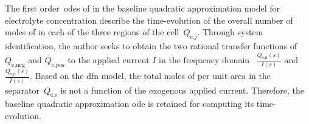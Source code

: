 
The                  first                 order~\glspl{ode}                  of
 in the baseline
quadratic  approximation  model  for   electrolyte  concentration  describe  the
time-evolution of the overall number of moles  of  in each of the three
regions of the cell~$Q_{\text{e,}j}$.  Through system identification, the author
seeks  to  obtain  the  two  rational  transfer  functions  of~$Q_\text{e,neg}$
and  $Q_\text{e,pos}$  to  the  applied  current $I$  in  the  frequency  domain
\ie~$\frac{Q_\text{e,n}(s)}{I(s)}$ and  $\frac{Q_\text{e,p}(s)}{I(s)}$. Based on
the  \gls{dfn}  model,  the total  moles  of    per  unit area  in  the
separator~$Q_\text{e,s}$  is not a  function of the exogenous  applied current.
Therefore,  the  baseline  quadratic  approximation \gls{ode}  is  retained  for
computing its time-evolution.

